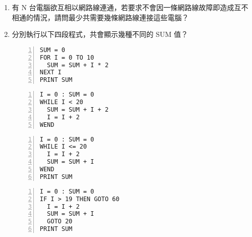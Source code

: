 \documentclass[12pt,a4paper]{report}
\begin{document}
\begin{CJK}{UTF8}{bkai}
\begin{enumerate}
\item 有 N 台電腦欲互相以網路線連通，若要求不會因一條網路線故障即造成互不相通的情況，請問最少共需要幾條網路線連接這些電腦？
\item 分別執行以下四段程式，共會顯示幾種不同的 SUM 值？
  \begin{multicols}{2}
    \begin{lstlisting}[language={[Visual]Basic},numbers=left,title=$\langle$程式 1$\rangle$]
SUM = 0
FOR I = 0 TO 10
  SUM = SUM + I * 2
NEXT I
PRINT SUM
    \end{lstlisting}
    \begin{lstlisting}[language={[Visual]Basic},numbers=left,title=$\langle$程式 2$\rangle$]
I = 0 : SUM = 0
WHILE I < 20
  SUM = SUM + I + 2
  I = I + 2
WEND
    \end{lstlisting}
  \end{multicols}
  \begin{multicols}{2}
    \begin{lstlisting}[language={[Visual]Basic},numbers=left,title=$\langle$程式 3$\rangle$]
I = 0 : SUM = 0
WHILE I <= 20
  I = I + 2
  SUM = SUM + I
WEND
PRINT SUM
    \end{lstlisting}
    \begin{lstlisting}[language={[Visual]Basic},numbers=left,title=$\langle$程式 4$\rangle$]
I = 0 : SUM = 0
IF I > 19 THEN GOTO 60
  I = I + 2
  SUM = SUM + I
  GOTO 20
PRINT SUM
    \end{lstlisting}
  \end{multicols}
\end{enumerate}


\end{CJK}
\end{document}
